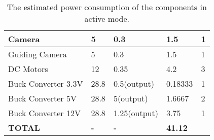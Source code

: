 \begin{center}
\begin{table}[H]
\begin{tabular}{|m{}|m{}|m{}|m{}|m{}|}
Camera                  & 5                               & 0.3                                 & 1.5                          & 1                 \\ \hline
Guiding Camera          & 5                               & 0.3                                 & 1.5                          & 1                 \\ \hline
DC Motors               & 12                              & 0.35                                & 4.2                          & 3                 \\ \hline
Buck Converter 3.3V     & 28.8                            & 0.5(output)                         & 0.18333                      & 1                 \\ \hline
Buck Converter 5V       & 28.8                            & 5(output)                           & 1.6667                       &  2                 \\ \hline
Buck Converter 12V      & 28.8                            & 1.25(output)                        & 3.75                         & 1                 \\ \hline
\textbf{TOTAL}          & \textbf{-}                      & \textbf{-}                   & \textbf{41.12}           &                   \\ \hline
\end{tabular}
\caption{The estimated power consumption of the components in active mode.}
\end{table}
\label{tab: power consumption}
\end{center}




\raggedbottom